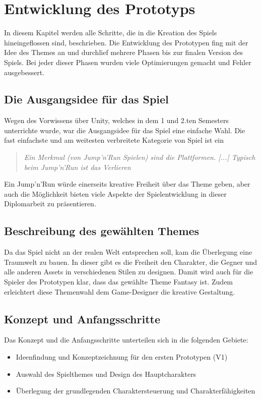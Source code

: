\pagebreak
\chapter{Entwicklung des Prototyps}

In diesem Kapitel werden alle Schritte, die in die Kreation des Spiels hineingeflossen sind, beschrieben. Die Entwicklung des Prototypen fing mit der Idee des Themes an und durchlief mehrere Phasen bis zur finalen Version des Spiels. Bei jeder dieser Phasen wurden viele Optimierungen gemacht und Fehler ausgebessert. 

\section{Die Ausgangsidee für das Spiel}

Wegen des Vorwissens über Unity, welches in dem 1 und 2.ten Semesters unterrichte wurde, war die Ausgangsidee für das Spiel eine einfache Wahl. Die fast einfachste und am weitesten verbreitete Kategorie von Spiel ist ein 

\begin{quote}
  \emph{\glqq Ein Merkmal (von Jump'n'Run Spielen) sind die Plattformen. [...] Typisch beim Jump'n'Run ist das Verlieren\grqq}~\cite[Art of Gaming; 1:42-1:57]{ArtOfGaming}
\end{quote}

Ein Jump'n'Run würde einerseits kreative Freiheit über das Theme geben, aber auch die Möglichkeit bieten viele Aspekte der Spielentwicklung in dieser Diplomarbeit zu präsentieren.

\section{Beschreibung des gewählten Themes}

Da das Spiel nicht an der realen Welt entsprechen soll, kam die Überlegung eine Traumwelt zu bauen. In dieser gibt es die Freiheit den Charakter, die Gegner und alle anderen Assets in verschiedenen Stilen zu designen. Damit wird auch für die Spieler des Prototypen klar, dass das gewählte Theme Fantasy ist. Zudem erleichtert diese Themenwahl dem Game-Designer die kreative Gestaltung.

\pagebreak

\section{Konzept und Anfangsschritte}
Das Konzept und die Anfangsschritte unterteilen sich in die folgenden Gebiete: 
\begin{itemize}
  \item Ideenfindung und Konzeptzeichnung für den ersten Prototypen (V1)
  \item Auswahl des Spielthemes und Design des Hauptcharakters
  \item Überlegung der grundlegenden Charaktersteuerung und Charakterfähigkeiten
\end{itemize}

